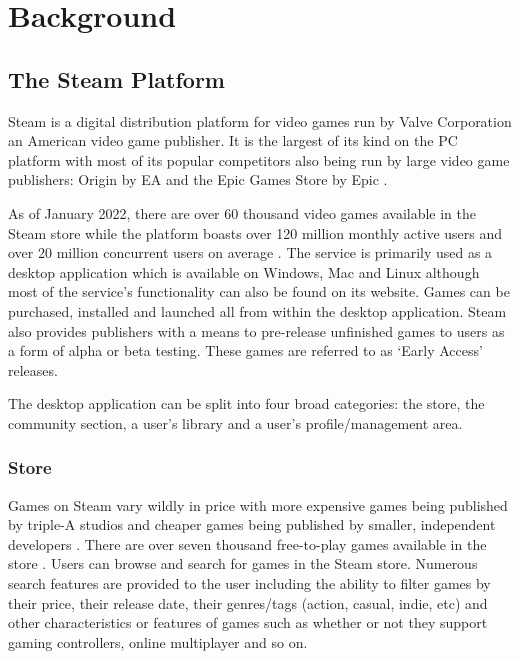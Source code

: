 \chapter{Background} \label{sec:BG}

\section{The Steam Platform} \label{sec:BG_Steam}

Steam is a digital distribution platform for video games run by Valve Corporation an American video game publisher. It is the largest of its kind on the PC platform \cite{SteamLargestDistributor} with most of its popular competitors also being run by large video game publishers: Origin by EA and the Epic Games Store by Epic \cite{SteamCompetitors}.

As of January 2022, there are over 60 thousand video games available in the Steam store \cite{SteamGameCount} while the platform boasts over 120 million monthly active users \cite{SteamMonthlyUsers} and over 20 million concurrent users on average \cite{SteamConcurrentUsers}. The service is primarily used as a desktop application which is available on Windows, Mac and Linux although most of the service's functionality can also be found on its website. Games can be purchased, installed and launched all from within the desktop application. Steam also provides publishers with a means to pre-release unfinished games to users as a form of alpha or beta testing. These games are referred to as `Early Access' releases.

The desktop application can be split into four broad categories: the store, the community section, a user's library and a user's profile/management area.

\subsection{Store}

Games on Steam vary wildly in price with more expensive games being published by triple-A studios and cheaper games being published by smaller, independent developers \cite{SteamGamePricing}. There are over seven thousand free-to-play games available in the store \cite{SteamFreeGameCount}. Users can browse and search for games in the Steam store. Numerous search features are provided to the user including the ability to filter games by their price, their release date, their genres/tags (action, casual, indie, etc) and other characteristics or features of games such as whether or not they support gaming controllers, online multiplayer and so on.

